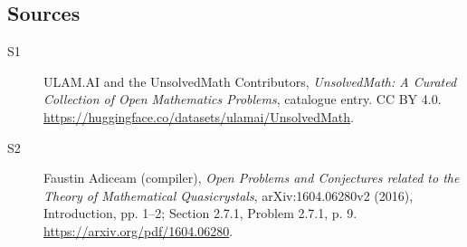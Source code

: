 \documentclass[11pt]{article}
\begin{document}
\subsection{Sources}
\begin{description}
\item[\hypertarget{source:statement:1}{S1}] ULAM.AI and the UnsolvedMath Contributors, \emph{UnsolvedMath: A Curated Collection of Open Mathematics Problems}, catalogue entry. CC BY 4.0. \url{https://huggingface.co/datasets/ulamai/UnsolvedMath}.
\item[\hypertarget{source:statement:2}{S2}] Faustin Adiceam (compiler), \emph{Open Problems and Conjectures related to the Theory of Mathematical Quasicrystals}, arXiv:1604.06280v2 (2016), Introduction, pp. 1--2; Section 2.7.1, Problem 2.7.1, p. 9. \url{https://arxiv.org/pdf/1604.06280}.
\end{description}
\label{end:statement}
\end{document}
